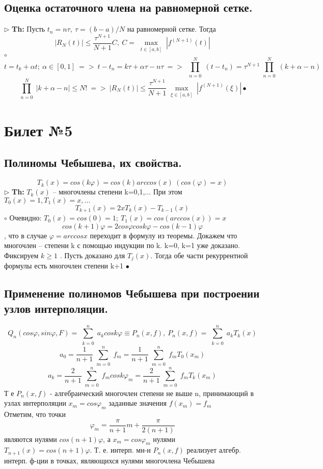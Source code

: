 \documentclass[a4paper]{article}
\begin{document}
\subsection{Оценка остаточного члена на равномерной сетке.}
$\triangleright$ \textbf{Th:} Пусть $t_n=n\tau, \ \tau=(b-a)/N$ на равномерной сетке. Тогда 
$$ |R_N(t)| \leq \frac{\tau^{N+1}}{N+1}C,\ C=\max_{\substack{t \in [a,b]}} |f^{(N+1)}(t)| $$
	$\circ$ 
		$$t=t_k+\alpha t;\ \alpha \in [0,1]\ => \ t-t_n=k\tau+\alpha\tau-n\tau \ => \ \prod_{\substack{n=0}}^N (t-t_n)=\tau^{N+1}\prod_{\substack{n=0}}^N (k+\alpha-n)$$
		$$ \prod_{\substack{n=0}}^N |k+\alpha-n| \leq N! \ => \ |R_N(t)|\leq \frac{\tau^{N+1}}{N+1} \max_{\substack{\xi \in [a,b]}} |f^{(N+1)}(\xi)| \bullet $$

\section{Билет №5}
\subsection{Полиномы Чебышева, их свойства.}
$$ T_k(x) = cos(k\varphi) = cos(k)arccos(x) \ (cos(\varphi)=x)$$
$\triangleright$ \textbf{Th:} $T_k(x)$ – многочлены степени k=0,1,... При этом $T_0(x) = 1, T_1(x) = x, \ldots$
$$ T_{k+1}(x) = 2x T_k(x) - T_{k-1}(x) $$
	$\circ$ 
	Очевидно: $T_0(x) = cos(0) = 1; \ T_1(x) = cos(arccos(x)) = x$
	$$cos (k+1)\varphi = 2 cos\varphi cos k\varphi - cos(k-1)\varphi$$, что в случае $\varphi=arccosx$ переходит в формулу из теоремы.
	Докажем что многочлен – степени k с помощью индукции по k. k=0, k=1 уже доказано. Фиксируем $k \ge 1$ . Пусть доказано для $T_j(x)$. Тогда обе части рекуррентной формулы есть многочлен степени k+1
	$\bullet$
\subsection{Применение полиномов Чебышева при построении узлов интерполяции.}
$$ Q_n(cos \varphi, sin\varphi, F) = \sum_{\substack{k=0}}^n a_kcos k\varphi \equiv P_n(x,f), \ P_n(x,f) = \sum_{\substack{k=0}}^n a_k T_k(x)$$
$$ a_0 = \frac{1}{n+1} \sum_{\substack{m=0}}^n f_m = \frac{1}{n+1} \sum_{\substack{m=0}}^n f_mT_0(x_m)$$
$$ a_k = \frac{2}{n+1} \sum_{\substack{m=0}}^n f_m cos k\varphi_m = \frac{2}{n+1} \sum_{\substack{m=0}}^n f_mT_k(x_m) $$
Т е $P_n(x,f)$ - алгебраический многочлен степени не выше n, принимающий в узлах интерполяции $x_m = cos\varphi_m$ заданные значения $f(x_m) = f_m$ \\
Отметим, что точки $$\varphi_m = \frac{\pi}{n+1}m + \frac{\pi}{2(n+1)} $$ являются нулями $cos(n+1)\varphi$, а $x_m=cos\varphi_m$ нулями $T_{n+1}(x) = cos(n+1)\varphi$. Т. е. интерп. мн-н $P_n(x,f)$ реализует алгебр. интерп. ф-ции в точках, являющихся нулями многочлена Чебышева
\end{document}
